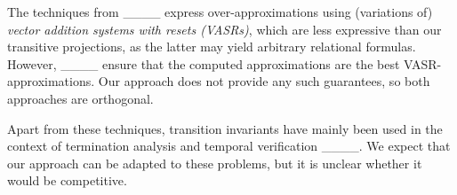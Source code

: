 The techniques from ____ express over-ap\-prox\-i\-ma\-tions using (variations of) \emph{vector addition systems with resets (VASRs)}, which are less expressive than our transitive projections, as the latter may yield arbitrary relational formulas.
%
However, ____ ensure that the computed ap\-prox\-i\-ma\-tions are the best VASR-ap\-prox\-i\-ma\-tions.
%
Our approach does not provide any such guarantees, so both approaches are orthogonal.

Apart from these techniques, transition invariants have mainly been used in the context of termination analysis and temporal verification ____.
%
We expect that our approach can be adapted to these problems, but it is unclear whether it would be competitive.